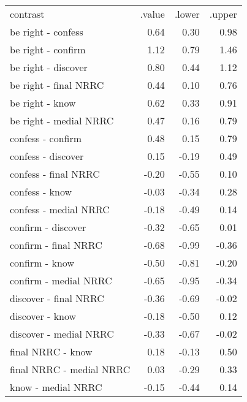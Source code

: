 \begin{longtable}{lrrr}
 contrast & .value & .lower & .upper \\ 
 be right - confess & 0.64 & 0.30 & 0.98 \\ 
  be right - confirm & 1.12 & 0.79 & 1.46 \\ 
  be right - discover & 0.80 & 0.44 & 1.12 \\ 
  be right - final NRRC & 0.44 & 0.10 & 0.76 \\ 
  be right - know & 0.62 & 0.33 & 0.91 \\ 
  be right - medial NRRC & 0.47 & 0.16 & 0.79 \\ 
  confess - confirm & 0.48 & 0.15 & 0.79 \\ 
  confess - discover & 0.15 & -0.19 & 0.49 \\ 
  confess - final NRRC & -0.20 & -0.55 & 0.10 \\ 
  confess - know & -0.03 & -0.34 & 0.28 \\ 
  confess - medial NRRC & -0.18 & -0.49 & 0.14 \\ 
  confirm - discover & -0.32 & -0.65 & 0.01 \\ 
  confirm - final NRRC & -0.68 & -0.99 & -0.36 \\ 
  confirm - know & -0.50 & -0.81 & -0.20 \\ 
  confirm - medial NRRC & -0.65 & -0.95 & -0.34 \\ 
  discover - final NRRC & -0.36 & -0.69 & -0.02 \\ 
  discover - know & -0.18 & -0.50 & 0.12 \\ 
  discover - medial NRRC & -0.33 & -0.67 & -0.02 \\ 
  final NRRC - know & 0.18 & -0.13 & 0.50 \\ 
  final NRRC - medial NRRC & 0.03 & -0.29 & 0.33 \\ 
  know - medial NRRC & -0.15 & -0.44 & 0.14 \\ 
  \end{longtable}

